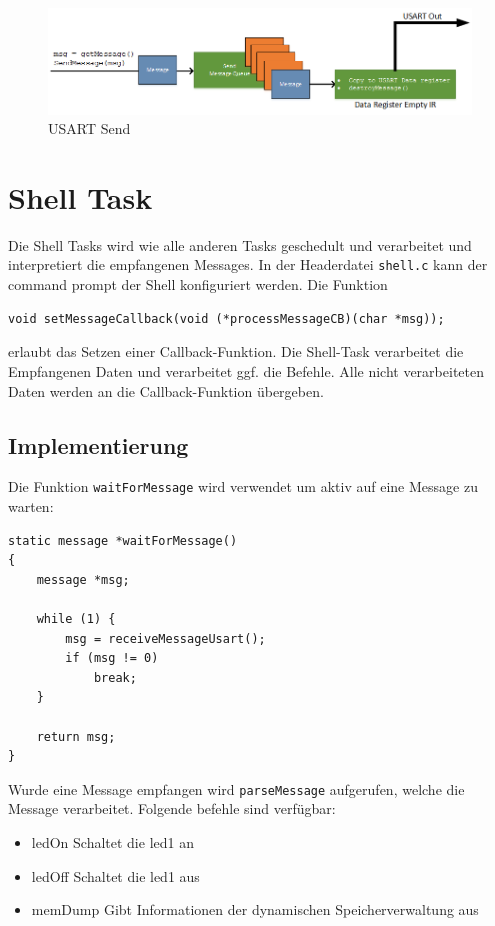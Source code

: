 \documentclass[fontsize=12pt, toc=bibliography, notitlepage]{scrreprt}
\begin{document}
\begin{figure}[H]
	\centering
	\includegraphics[width=450px]{images/UsartOut.png}
	\caption{USART Send}
	\label{fig:usart_send}
\end{figure}

\section{Shell Task}
\label{subsec:shell-task}
Die Shell Tasks wird wie alle anderen Tasks geschedult und verarbeitet und interpretiert die empfangenen Messages. In der Headerdatei \lstinline$shell.c$ kann der command prompt der Shell konfiguriert werden. Die Funktion\\

\begin{lstlisting}
void setMessageCallback(void (*processMessageCB)(char *msg));
\end{lstlisting}

erlaubt das Setzen einer Callback-Funktion. Die Shell-Task verarbeitet die Empfangenen Daten und verarbeitet ggf. die Befehle. Alle nicht verarbeiteten Daten werden an die Callback-Funktion übergeben.

\subsection{Implementierung}
Die Funktion \lstinline$waitForMessage$ wird verwendet um aktiv auf eine Message zu warten:

\begin{lstlisting}
static message *waitForMessage()
{
    message *msg;

    while (1) {
        msg = receiveMessageUsart();
        if (msg != 0)
            break;
    }

    return msg;
}
\end{lstlisting}

Wurde eine Message empfangen wird \lstinline$parseMessage$ aufgerufen, welche die Message verarbeitet. Folgende befehle sind verfügbar:

\begin{itemize}
	\item ledOn Schaltet die led1 an
	\item ledOff Schaltet die led1 aus
	\item memDump Gibt Informationen der dynamischen Speicherverwaltung aus
\end{itemize}
\end{document}
